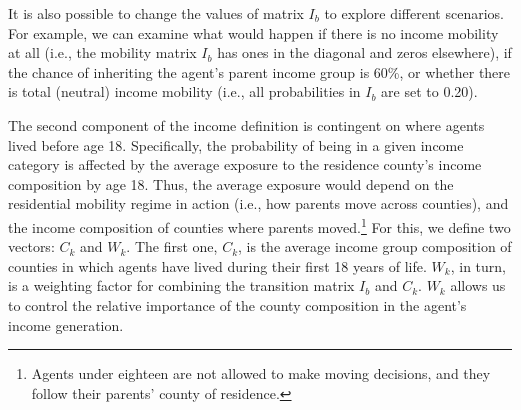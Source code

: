 \documentclass[class=article, crop=false, 12pt]{standalone}
\begin{document}
 It is also possible to change the values of matrix $I_b$ to explore different scenarios. For example, we can examine what would happen if there is no income mobility at all (i.e., the mobility matrix $I_b$ has ones in the diagonal and zeros elsewhere), if the chance of inheriting the agent's parent income group is 60\%, or whether there is total (neutral) income mobility (i.e., all probabilities in $I_b$ are set to 0.20).

The second component of the income definition is contingent on where agents lived before age 18. Specifically, the probability of being in a given income category is affected by the average exposure to the residence county's income composition by age 18. Thus, the average exposure would depend on the residential mobility regime in action (i.e., how parents move across counties), and the income composition of counties where parents moved.\footnote{Agents under eighteen are not allowed to make moving decisions, and they follow their parents' county of residence.} For this, we define two vectors: $C_k$ and $W_k$. The first one, $C_k$, is the average income group composition of counties in which agents have lived during their first 18 years of life. $W_k$, in turn, is a weighting factor for combining the transition matrix $I_b$ and $C_k$. $W_k$ allows us to control the relative importance of the county composition in the agent's income generation. 
\end{document}

